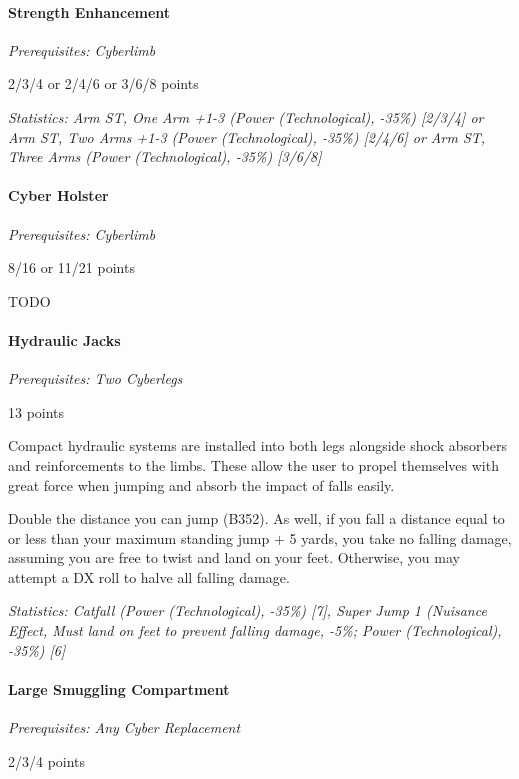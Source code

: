 \begin{multicols*}{3}
	\paragraph{Strength Enhancement}
	\textit{Prerequisites: Cyberlimb}
	\begin{flushright}
		2/3/4 or 2/4/6 or 3/6/8 points
	\end{flushright}
	
	\textit{\textcolor{OliveGreen}{Statistics: Arm ST, One Arm +1-3 (Power (Technological), -35\%) [2/3/4] or Arm ST, Two Arms +1-3 (Power (Technological), -35\%) [2/4/6] or Arm ST, Three Arms (Power (Technological), -35\%) [3/6/8]}}
	
	
	\paragraph{Cyber Holster}
	\textit{Prerequisites: Cyberlimb}
	\begin{flushright}
		8/16 or 11/21 points
	\end{flushright}
	
	TODO
	
	\paragraph{Hydraulic Jacks}
	\textit{Prerequisites: Two Cyberlegs}
	\begin{flushright}
		13 points
	\end{flushright}
	
	Compact hydraulic systems are installed into both legs alongside shock absorbers and reinforcements to the limbs. These  allow the user to propel themselves with great force when jumping and absorb the impact of falls easily.
	
	Double the distance you can jump (B352). As well, if you fall a distance equal to or less than your maximum standing jump + 5 yards, you take no falling damage, assuming you are free to twist and land on your feet. Otherwise, you may attempt a DX roll to halve all falling damage.
	
	\textit{\textcolor{OliveGreen}{Statistics: Catfall (Power (Technological), -35\%) [7], Super Jump 1 (Nuisance Effect, Must land on feet to prevent falling damage, -5\%; Power (Technological), -35\%) [6]}}
	
	\paragraph{Large Smuggling Compartment}
	\textit{Prerequisites: Any Cyber Replacement}
	\begin{flushright}
		2/3/4 points
	\end{flushright}
	

\end{multicols*}
